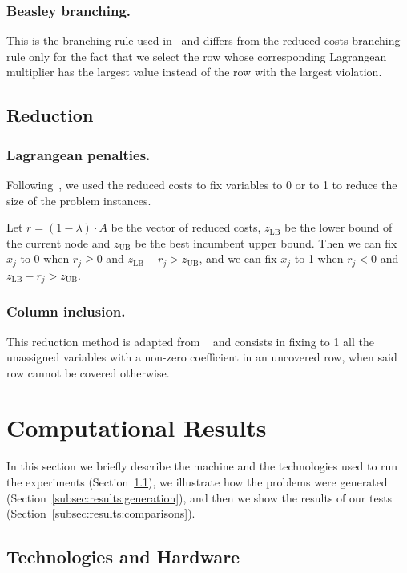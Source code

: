 \documentclass[runningheads]{llncs}
\begin{document}
\subsubsection{Beasley branching.} This is the branching rule used in~\cite{beasley-1987-algorithm} and differs from the reduced costs branching rule only for the fact that we select the row whose corresponding Lagrangean multiplier has the largest value instead of the row with the largest violation.

\subsection{Reduction}
\label{subsec:branch-bound:reduction}

\subsubsection{Lagrangean penalties.} Following~\cite{beasley-1987-algorithm}, we used the reduced costs to fix variables to 0 or to 1 to reduce the size of the problem instances. 

Let $r = (1 - \lambda) \cdot A$ be the vector of reduced costs, $z_{\text{LB}}$ be the lower bound of the current node and $z_{\text{UB}}$ be the best incumbent upper bound. Then we can fix $x_j$ to 0 when $r_j \ge 0$ and $z_{\text{LB}} + r_j > z_{\text{UB}}$, and we can fix $x_j$ to 1 when $r_j < 0$ and $z_{\text{LB}} - r_j > z_{\text{UB}}$.  

\subsubsection{Column inclusion.} This reduction method is adapted from ~\cite{beasley-1987-algorithm} and consists in fixing to 1 all the unassigned variables with a non-zero coefficient in an uncovered row, when said row cannot be covered otherwise.

\section{Computational Results}
\label{sec:results}

In this section we briefly describe the machine and the technologies used to run the experiments (Section~\ref{subsec:results:tech}), we illustrate how the problems were generated (Section~\ref{subsec:results:generation}), and then we show the results of our tests (Section~\ref{subsec:results:comparisons}).  

\subsection{Technologies and Hardware}
\label{subsec:results:tech}
\end{document}
